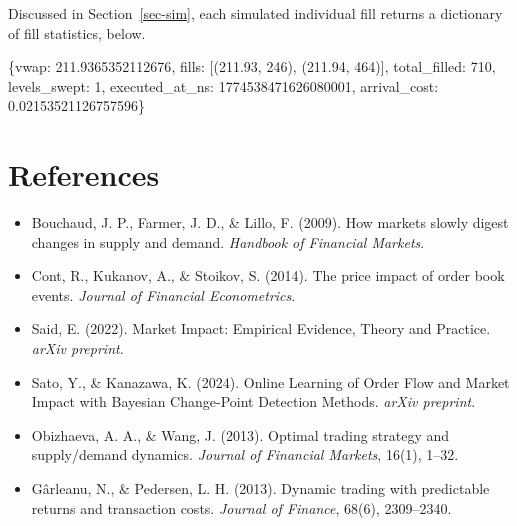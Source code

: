 \documentclass[
  letterpaper,
]{article}
\newenvironment{Shaded}{\begin{snugshade}}{\end{snugshade}}
\newcommand{\DecValTok}[1]{\textcolor[rgb]{0.68,0.00,0.00}{#1}}
\newcommand{\FloatTok}[1]{\textcolor[rgb]{0.68,0.00,0.00}{#1}}
\newcommand{\NormalTok}[1]{\textcolor[rgb]{0.00,0.23,0.31}{#1}}
\newcommand{\StringTok}[1]{\textcolor[rgb]{0.13,0.47,0.30}{#1}}
\providecommand{\tightlist}{%
  \setlength{\itemsep}{0pt}\setlength{\parskip}{0pt}}
\begin{document}
Discussed in Section~\ref{sec-sim}, each simulated individual fill
returns a dictionary of fill statistics, below.

\begin{Shaded}
\begin{Highlighting}[]
\NormalTok{\{}\StringTok{\textquotesingle{}vwap\textquotesingle{}}\NormalTok{: }\FloatTok{211.9365352112676}\NormalTok{,}
 \StringTok{\textquotesingle{}fills\textquotesingle{}}\NormalTok{: [(}\FloatTok{211.93}\NormalTok{, }\DecValTok{246}\NormalTok{), (}\FloatTok{211.94}\NormalTok{, }\DecValTok{464}\NormalTok{)],}
 \StringTok{\textquotesingle{}total\_filled\textquotesingle{}}\NormalTok{: }\DecValTok{710}\NormalTok{,}
 \StringTok{\textquotesingle{}levels\_swept\textquotesingle{}}\NormalTok{: }\DecValTok{1}\NormalTok{,}
 \StringTok{\textquotesingle{}executed\_at\_ns\textquotesingle{}}\NormalTok{: }\DecValTok{1774538471626080001}\NormalTok{,}
 \StringTok{\textquotesingle{}arrival\_cost\textquotesingle{}}\NormalTok{: }\FloatTok{0.02153521126757596}\NormalTok{\}}
\end{Highlighting}
\end{Shaded}

\section{References}\label{references}

\begin{itemize}
\tightlist
\item
  Bouchaud, J. P., Farmer, J. D., \& Lillo, F. (2009). How markets
  slowly digest changes in supply and demand. \emph{Handbook of
  Financial Markets}.
\item
  Cont, R., Kukanov, A., \& Stoikov, S. (2014). The price impact of
  order book events. \emph{Journal of Financial Econometrics}.
\item
  Said, E. (2022). Market Impact: Empirical Evidence, Theory and
  Practice. \emph{arXiv preprint}.
\item
  Sato, Y., \& Kanazawa, K. (2024). Online Learning of Order Flow and
  Market Impact with Bayesian Change-Point Detection Methods.
  \emph{arXiv preprint}.
\item
  Obizhaeva, A. A., \& Wang, J. (2013). Optimal trading strategy and
  supply/demand dynamics. \emph{Journal of Financial Markets}, 16(1),
  1--32.
\item
  Gârleanu, N., \& Pedersen, L. H. (2013). Dynamic trading with
  predictable returns and transaction costs. \emph{Journal of Finance},
  68(6), 2309--2340.
\end{itemize}
\end{document}
